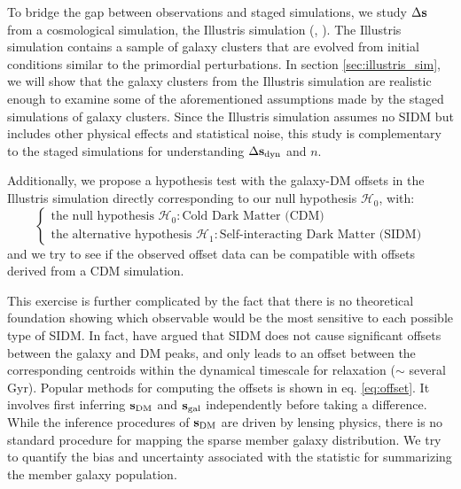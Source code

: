 To bridge the gap between observations and staged simulations, we
study $\Delta {\bf s}$ from a cosmological simulation, the Illustris simulation
(\citealt{Vogelsberger2014}, \citealt{Genel2014a}). 
The Illustris simulation contains a sample of galaxy clusters that are evolved
from initial conditions similar to the primordial
perturbations. In section \ref{sec:illustris_sim},
we will show that the galaxy clusters from the Illustris simulation 
are realistic enough to examine some of the aforementioned assumptions made by the
staged simulations of galaxy clusters. Since the Illustris simulation assumes no SIDM but 
includes other physical effects and statistical noise, 
this study is complementary to the 
staged simulations for understanding $\Delta {\bf s}_{\rm dyn}$ and $n$. 

Additionally, we propose a hypothesis test with the galaxy-DM offsets in
the Illustris simulation directly corresponding to our null hypothesis
$\mathcal{H}_0$, with: 
\begin{equation}
\begin{cases}
	\text{the null hypothesis }\mathcal{H}_0: \text{Cold Dark Matter (CDM)} \\
	\text{the alternative hypothesis }\mathcal{H}_1: \text{Self-interacting Dark
	Matter (SIDM)} 
\end{cases}
\end{equation}
and we try to see if the observed offset data can be compatible with offsets
derived from a CDM simulation. 


This exercise is further complicated by the fact that there is no theoretical
foundation showing which observable would be the most sensitive to each
possible type of SIDM. In fact, \cite{Kahlhoefer14} have argued that SIDM 
does not cause
significant offsets between the galaxy and DM peaks, and only leads to an offset
between the corresponding centroids within the dynamical timescale for
relaxation ($\sim$ several Gyr). 
Popular methods for computing the offsets is shown in eq. \ref{eq:offset}.
It involves first inferring ${\bf s}_{\rm DM}$ 
and ${\bf s}_{\rm gal}$ independently before taking a difference.
While the inference procedures of ${\bf s}_{\rm DM}$ are driven by lensing 
physics, there is no standard procedure for
mapping the sparse member galaxy distribution. 
We try to quantify the bias and uncertainty associated with the
statistic for summarizing the member galaxy population. 

